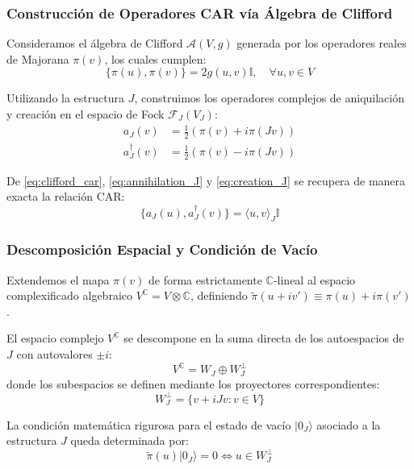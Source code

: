 \begin{frame}
  \frametitle{Construcción de Operadores CAR vía Álgebra de Clifford}

  Consideramos el álgebra de Clifford $\mathcal{A}(V, g)$ generada por los operadores reales de Majorana $\pi(v)$, los cuales cumplen:
  \begin{equation}
    \{\pi(u), \pi(v)\} = 2g(u, v)\mathbb{I}, \quad \forall u,v \in V
    \label{eq:clifford_car}
  \end{equation}

  Utilizando la estructura $J$, construimos los operadores complejos de aniquilación y creación en el espacio de Fock $\mathcal{F}_J(V_J)$:
  \begin{align}
    a_J(v) &= \frac{1}{2}\left(\pi(v) + i\pi(Jv)\right) \label{eq:annihilation_J} \\
    a_J^{\dagger}(v) &= \frac{1}{2}\left(\pi(v) - i\pi(Jv)\right) \label{eq:creation_J}
  \end{align}

  De \eqref{eq:clifford_car}, \eqref{eq:annihilation_J} y \eqref{eq:creation_J} se recupera de manera exacta la relación CAR:
  \begin{equation}
    \{a_J(u), a_J^{\dagger}(v)\} = \langle u, v \rangle_J \mathbb{I}
  \end{equation}
\end{frame}

\begin{frame}
  \frametitle{Descomposición Espacial y Condición de Vacío}

  Extendemos el mapa $\pi(v)$ de forma estrictamente $\mathbb{C}$-lineal al espacio complexificado algebraico $V^\mathbb{C} = V \otimes \mathbb{C}$, definiendo $\tilde{\pi}(u + iv') \equiv \pi(u) + i\pi(v')$. 

  \vspace{0.2cm}
  El espacio complejo $V^\mathbb{C}$ se descompone en la suma directa de los autoespacios de $J$ con autovalores $\pm i$:
  \begin{equation}
    V^\mathbb{C} = W_J \oplus W_J^\perp
  \end{equation}
  donde los subespacios se definen mediante los proyectores correspondientes:
  \begin{equation}
    W_J^\perp = \{v + iJv : v \in V\}
  \end{equation}

  \vspace{0.2cm}
  La condición matemática rigurosa para el estado de vacío $|0_J\rangle$ asociado a la estructura $J$ queda determinada por:
  \begin{equation}
    \tilde{\pi}(u)|0_J\rangle = 0 \iff u \in W_J^\perp
  \end{equation}
\end{frame}
